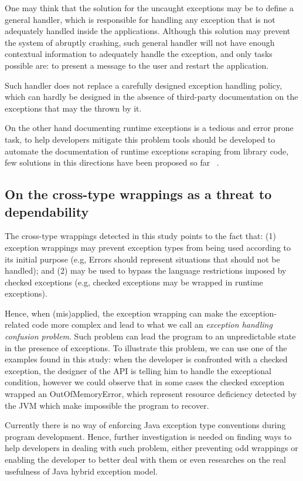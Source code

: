 \documentclass[conference]{IEEEtran}
\begin{document}
One may think that the solution for the uncaught exceptions 
may be to define a general handler, 
which is responsible for handling any exception that is not
adequately handled inside the applications. Although this 
solution may prevent  the system of abruptly crashing,
 such general handler will not have enough
contextual information to adequately handle the exception, 
and only tasks possible are: to present a message to the user
 and restart the application.

Such handler does not replace a carefully designed exception 
handling policy, which can hardly be designed in the absence of 
third-party documentation on the exceptions that
may the thrown by it.

On the other hand documenting runtime exceptions is a tedious and error prone task, to help developers
mitigate this problem tools should be developed to automate the documentation of runtime exceptions
scraping from library code, few solutions in this directions have been proposed so far ~\cite{van2005combining}. 

\subsection{On the cross-type wrappings as a threat to dependability}
The cross-type wrappings detected in this study points to the fact that: (1) exception 
wrappings may prevent exception types from being used according to its initial purpose
 (e.g, Errors should represent situations that should not be handled); and (2) may  be used
 to bypass the language restrictions imposed by checked exceptions  (e.g,
 checked exceptions may be wrapped in runtime exceptions).

Hence, when (mis)applied, the exception wrapping can make the exception-related code
 more complex and lead to what we call an \emph{exception handling confusion problem}.
Such problem can lead the program to
an unpredictable state in the presence of exceptions. To illustrate this problem, we can use
 one of the examples found in this study: when the developer is 
confronted with a checked exception, the designer of the API is telling him 
to handle the exceptional condition, however we could observe that in some cases the 
checked exception wrapped an OutOfMemoryError, which represent resource deficiency detected 
by the JVM which make impossible the program to recover. 

Currently there is no way of enforcing Java exception type conventions during program development.
Hence, further investigation is needed on finding ways to help developers in dealing with such
 problem, either preventing odd wrappings or enabling the developer to better deal with them or even
researches on the real usefulness of Java hybrid exception model. 
\end{document}
